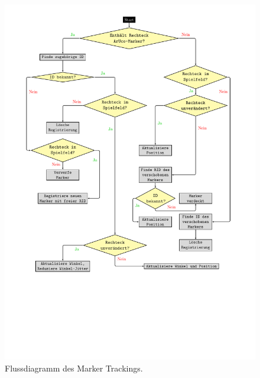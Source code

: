 \begin{figure}[htbp]
	\centering
	\includegraphics[scale=.8, trim=3cm 2.5cm 3.5cm 9 cm]{kapitel/system/MP_Marker_Erkennung.pdf}
	\caption{Flussdiagramm des Marker Trackings.}
	\label{fig:TrackingDiagram}
\end{figure}

